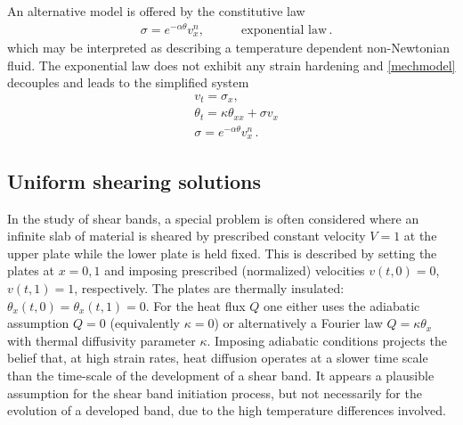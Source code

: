\documentclass[a4paper,11pt]{article}
\newcommand{\tht}{\theta}
\newcommand{\ga}{\alpha}
\theoremstyle{remark}
\begin{document}
An alternative model is offered by the constitutive law
\begin{align}
& \sigma = e^{-\ga\tht} v_x^n, \quad & & \text{ exponential law} \label{ARL0}  \, .
\end{align}
which may be interpreted as describing a temperature dependent non-Newtonian fluid.
The exponential law does not exhibit any strain hardening and \eqref{mechmodel} decouples and
leads to the simplified system
\begin{equation}
  \label{ARS}
  \begin{aligned}
    & v_{t} = \sigma_{x},\\
    & \theta_{t} = \kappa \theta_{ x x}  +  \sigma v_x \\
    & \sigma  = e^{-\ga\theta} v_x^n \, .
  \end{aligned}
\end{equation}



\subsection{Uniform shearing solutions} \label{sec:uss}

In the study of shear bands,  a special problem is often considered  where an infinite slab of material
is  sheared by prescribed constant velocity $V=1$ at the upper plate while the lower plate is held fixed.
This is described by setting the plates at $x=0, 1$ and imposing prescribed (normalized) velocities $v(t,0) = 0$,  $v(t,1) = 1$, respectively.
The plates are thermally insulated:  $ \theta_{x}(t,0) = \theta_{x}(t,1) = 0$.
For the heat flux $Q$ one either uses the adiabatic assumption $Q = 0$ (equivalently $\kappa = 0$)
or alternatively a Fourier  law $Q = \kappa \theta_{x}$ with thermal diffusivity
parameter $\kappa$.
Imposing adiabatic conditions projects the belief that, at high strain rates,
heat diffusion operates at a slower time scale than the time-scale of the development
of a shear band. It appears a plausible assumption for the shear band initiation process,
but not necessarily for the evolution of a developed band,
 due to the high temperature differences involved.
\end{document}
